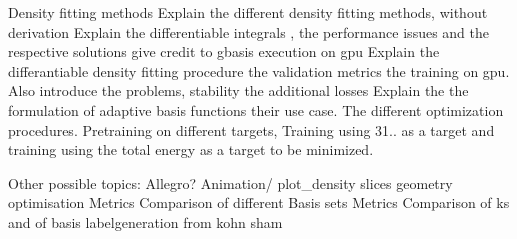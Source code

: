 Density fitting methods 
Explain the different density fitting methods, without derivation
Explain the differentiable integrals , the performance issues and the respective solutions give credit to gbasis execution on gpu
Explain the differantiable density fitting procedure the validation metrics the training on gpu.
Also introduce the problems, stability the additional losses
Explain the the formulation of adaptive basis functions their use case. The different optimization procedures. Pretraining on different targets, Training using 31.. as a target and training using the total energy as a target to be minimized.




Other possible topics:
Allegro?
Animation/ plot_density slices
geometry optimisation
Metrics
Comparison of different Basis sets Metrics 
Comparison of ks and of basis
labelgeneration  from kohn sham
